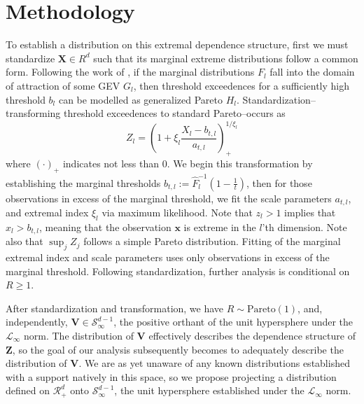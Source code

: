 \section{Methodology}
\label{sec:methodology}
To establish a distribution on this extremal dependence structure, first we must standardize $\bm{X} \in R^d$
  such that its marginal extreme distributions follow a common form.  Following the work of
  \cite{ferreira2014}, if the marginal distributions $F_{l}$ fall into the domain
  of attraction of some GEV $G_l$, then threshold exceedences for a sufficiently high threshold $b_{l}$
  can be modelled as generalized Pareto $H_l$.  Standardization--transforming threshold exceedences to
  standard Pareto--occurs as
  \begin{equation}
    \label{eqn:standardization}
    Z_l = \left(1 + \xi_l\frac{X_l - b_{t,l}}{a_{t,l}}\right)_{+}^{1/\xi_l}
  \end{equation}
  where $(\cdot)_{+}$ indicates not less than 0. We begin this transformation by establishing the
  marginal thresholds $b_{t,l} := \hat{F}_l^{-1}\left(1 - \frac{1}{t}\right)$, then for those observations
  in excess of the marginal threshold, we fit the scale parameters $a_{t,l}$, and extremal index $\xi_l$
  via maximum likelihood. Note that $z_l > 1$ implies that $x_l > b_{t,l}$, meaning that the observation
  $\bm{x}$ is extreme in the $l$'th dimension.  Note also that $\sup_j Z_j$ follows a simple Pareto
  distribution. Fitting of the marginal extremal index and scale parameters uses only observations in
  excess of the marginal threshold. Following standardization, further analysis is conditional on
  $R \geq 1$.

After standardization and transformation, we have $R\sim\text{Pareto}(1)$, and, independently,
  $\bm{V}\in\mathcal{S}_{\infty}^{d-1}$, the positive orthant of the unit hypersphere under the
  $\mathcal{L}_{\infty}$ norm.  The distribution of $\bm{V}$ effectively describes the dependence
  structure of $\bm{Z}$, so the goal of our analysis subsequently becomes to adequately describe the
  distribution of $\bm{V}$.  We are as yet unaware of any known distributions established with a support
  natively in this space, so we propose projecting a distribution defined on $\mathcal{R}_{+}^{d}$ onto
  $\mathcal{S}_{\infty}^{d-1}$, the unit hypersphere established under the $\mathcal{L}_{\infty}$ norm.









